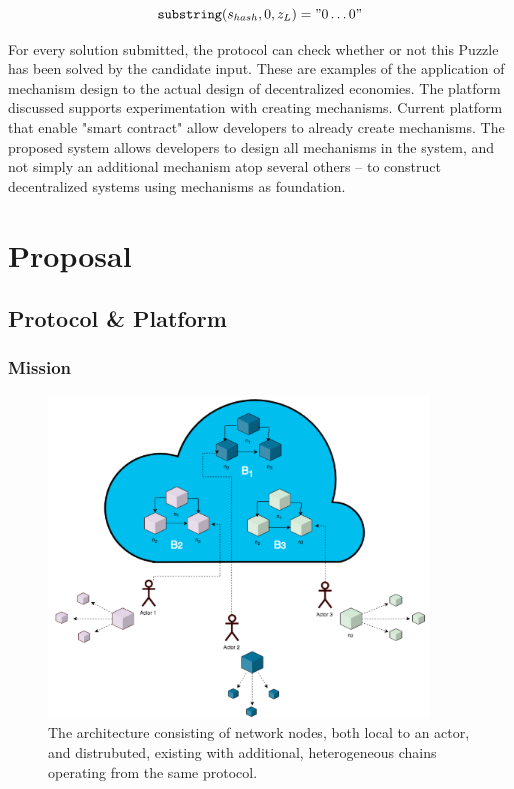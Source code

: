\documentclass[12pt, titlepage, twocolumn]{report}
\begin{document}
\begin{equation}
	\texttt{substring}(s_{hash}, 0, z_L) =  "0 \ldots 0"
\end{equation}

For every solution submitted, the protocol can check whether or not this Puzzle has been solved by the candidate input. These are examples of the application of mechanism design to the actual design of decentralized economies. The platform discussed supports experimentation with creating mechanisms. Current platform that enable "smart contract" allow developers to already create mechanisms. The proposed system allows developers to design all mechanisms in the system, and not simply an additional mechanism atop several others -- to construct decentralized systems using mechanisms as foundation.
 

\part{Proposal}

\chapter{Protocol \& Platform}


\section{Mission}

\begin{figure}[ht]
\centering
	\includegraphics[width=0.9\textwidth]{kunta_arch}
	\caption{The architecture consisting of network nodes, both local to an actor, and distrubuted, existing with additional, heterogeneous chains operating from the same protocol.}
	\label{kunta_arch}
\end{figure}
\end{document}
